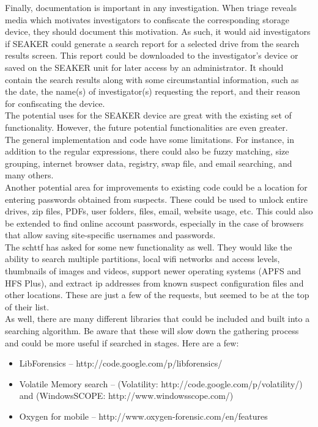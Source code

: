 \documentclass[12pt]{article}
\begin{document}
Finally, documentation is important in any investigation. When triage reveals media which motivates
investigators to confiscate the corresponding storage device, they should document this motivation. As
such, it would aid investigators if SEAKER could generate a search report for a selected drive from
the search results screen. This report could be downloaded to the investigator’s device or saved on the
SEAKER unit for later access by an administrator. It should contain the search results along with some
circumstantial information, such as the date, the name(s) of investigator(s) requesting the report, and
their reason for confiscating the device.\\

The potential uses for the SEAKER device are great with the existing set of
functionality.  However, the future potential functionalities are even greater.\\

The general implementation and code have some limitations.  For instance,
in addition to the regular expressions, there could also be fuzzy matching, size
grouping, internet browser data, registry, swap file, and email searching, and
many others.\\

Another potential area for improvements to existing code could be a location for
entering passwords obtained from suspects.  These could be used to unlock entire
drives, zip files, PDFs, user folders, files, email, website usage, etc.  This
could also be extended to find online account passwords, especially in the case
of browsers that allow saving site-specific usernames and passwords.\\

The \gls{schttf} has asked for some new functionality as well.  They would like the
ability to search multiple partitions, local \gls{wifi} networks and access levels, 
thumbnails of images and videos, support newer operating systems (APFS and
HFS Plus), and extract \gls{ip} addresses from known suspect configuration files and 
other locations.  These are just a few of the requests, but seemed to be at
the top of their list.\\

As well, there are many different libraries that could be included and built
into a searching algorithm.  Be aware that these will slow down the gathering
process and could be more useful if searched in stages.  Here are a few:

\vspace{0.5 cm}
\begin{itemize}
  \item LibForensics -- http://code.google.com/p/libforensics/
  \item Volatile Memory search -- (Volatility: http://code.google.com/p/volatility/) and (WindowsSCOPE: http://www.windowsscope.com/)
  \item Oxygen for mobile -- http://www.oxygen-forensic.com/en/features
\end{itemize}
\vspace{0.5 cm}
\end{document}
